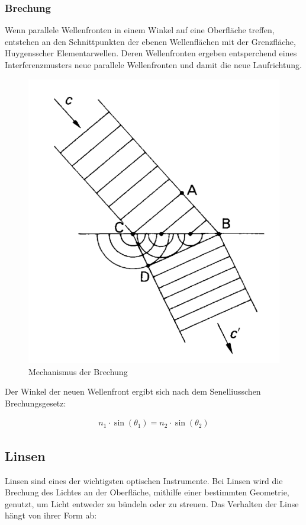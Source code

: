 \documentclass[a4paper]{scrartcl}
\numberwithin{equation}{subsection}
\begin{document}
\subsubsection{Brechung}

Wenn parallele Wellenfronten in einem Winkel auf eine Oberfläche treffen, entstehen an den Schnittpunkten der ebenen Wellenflächen mit der Grenzfläche, Huygensscher Elementarwellen. Deren Wellenfronten ergeben entsperchend eines Interferenzmusters neue parallele Wellenfronten und damit die neue Laufrichtung. \cite{phys}

\begin{figure}[H]
\includegraphics[width=12cm]{Abbildungen/mechanismus-der-brechung}
\centering
\caption{Mechanismus der Brechung \cite{phys}}
\centering
\label{fig:mechanismus-der-brechung}
\end{figure}

Der Winkel der neuen Wellenfront ergibt sich nach dem Senelliusschen Brechungsgesetz: \cite{hering}

\begin{align}
n_1 \cdot \sin(\theta_1) = n_2 \cdot \sin(\theta_2)
\end{align}


\subsection{Linsen}
Linsen sind eines der wichtigsten optischen Instrumente. Bei Linsen wird die Brechung des Lichtes an der Oberfläche, mithilfe einer bestimmten Geometrie, genutzt, um Licht entweder zu bündeln oder zu streuen.
Das Verhalten der Linse hängt von ihrer Form ab: \cite{anl}
\end{document}
